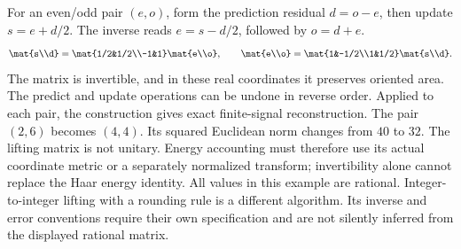 For an even/odd pair $(e,o)$, form the prediction residual $d=o-e$, then update $s=e+d/2$. The inverse reads $e=s-d/2$, followed by $o=d+e$.
\[
\mat{s\\d}=\mat{1/2&1/2\\-1&1}\mat{e\\o},
\qquad
\mat{e\\o}=\mat{1&-1/2\\1&1/2}\mat{s\\d}.
\]
The matrix is invertible, and in these real coordinates it preserves oriented area. The predict and update operations can be undone in reverse order. Applied to each pair, the construction gives exact finite-signal reconstruction.
The pair $(2,6)$ becomes $(4,4)$. Its squared Euclidean norm changes from $40$ to $32$. The lifting matrix is not unitary. Energy accounting must therefore use its actual coordinate metric or a separately normalized transform; invertibility alone cannot replace the Haar energy identity.
All values in this example are rational. Integer-to-integer lifting with a rounding rule is a different algorithm. Its inverse and error conventions require their own specification and are not silently inferred from the displayed rational matrix.

